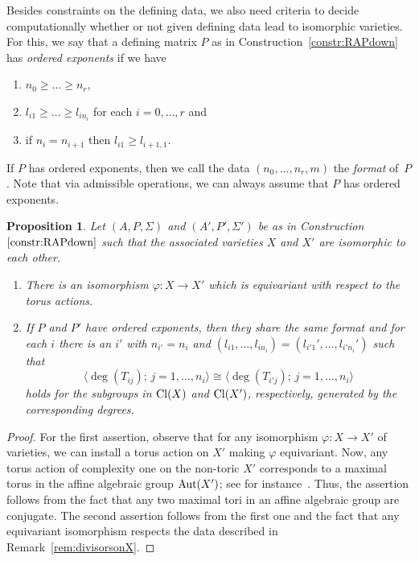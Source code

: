 \documentclass[10pt,a4paper]{amsart}
\newtheorem{prop}[thm]{Proposition}
\theoremstyle{definition}
\def\Cl{{\rm Cl}}
\def\bangle#1{{\langle #1 \rangle}}
\def\Aut{{\rm Aut}}
\numberwithin{equation}{section}
\begin{document}
Besides constraints on the defining data,
we also need criteria to decide computationally
whether or not given defining data lead to
isomorphic varieties.
For this, we say that a defining matrix $P$ as in
Construction~\ref{constr:RAPdown}
has \emph{ordered exponents} if
we have
\begin{enumerate}\itemsep=0pt
 \item[$(i)$] $n_0 \ge \dots \ge n_r$,
 \item[$(ii)$] $l_{i1} \ge \dots \ge l_{in_i}$ for each $i = 0, \dots, r$ and
 \item[$(iii)$] if $n_i = n_{i+1}$ then $l_{i1} \ge l_{i+1, 1}$.
\end{enumerate}
If $P$ has ordered exponents,
then we call the data
$(n_0, \dots, n_r,m)$
the \emph{format} of~$P$.
Note that via admissible operations,
we can always assume that $P$ has ordered
exponents.

\begin{prop}
\label{prop:non-iso-crit}
Let $(A,P,\Sigma)$ and $(A',P',\Sigma')$
be as in Construction~$\ref{constr:RAPdown}$
such that the associated varieties
$X$ and $X'$ are isomorphic to each other.
\begin{enumerate}\itemsep=0pt
\item[$(i)$]
There is an isomorphism $\varphi \colon X \to X'$
which is equivariant with respect to the torus
actions.
\item[$(ii)$]
If $P$ and $P'$ have ordered exponents, then
they share the same format and for each $i$
there is an $i'$ with $n_{i'} = n_i$ and
$(l_{i1}, \dots, l_{in_i}) = (l_{i'1}', \dots, l_{i'n_i}')$
such that
\[
\bangle{\deg(T_{ij}); \, j = 1, \dots, n_i}
 \cong
\bangle{\deg(T_{i'j}); \, j = 1, \dots, n_i}
\]
holds for the subgroups in $\Cl(X)$
and $\Cl(X')$, respectively, generated by the
corresponding degrees.
\end{enumerate}
\end{prop}



\begin{proof}
For the first assertion, observe that for
any isomorphism $\varphi \colon X \to X'$
of varieties, we can install a torus action
on $X'$ making $\varphi$ equivariant.
Now, any torus action of complexity one on
the non-toric $X'$ corresponds to a maximal
torus in the affine algebraic group $\Aut(X')$;
see for instance~\cite[Theorem~2.1]{ArHaHeLi}.
Thus, the assertion follows from the fact that
any two maximal tori in an affine algebraic
group are conjugate.
The second assertion follows from the first one
and the fact that any equivariant isomorphism
respects the data described in
Remark~\ref{rem:divisorsonX}.
\end{proof}
\end{document}
